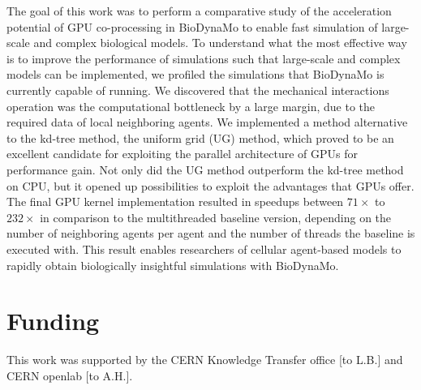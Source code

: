\documentclass[conference]{IEEEtran}
\begin{document}
\par The goal of this work was to perform a comparative study of the acceleration potential of GPU co-processing in BioDynaMo to enable fast simulation of large-scale and complex biological models.
To understand what the most effective way is to improve the performance of simulations such that large-scale and complex models can be implemented, we profiled the simulations that BioDynaMo is currently capable of running.
We discovered that the mechanical interactions operation was the computational bottleneck by a large margin, due to the required data of local neighboring agents.
We implemented a method alternative to the kd-tree method, the uniform grid (UG) method, which proved to be an excellent candidate for exploiting the parallel architecture of GPUs for performance gain.
Not only did the UG method outperform the kd-tree method on CPU, but it opened up possibilities to exploit the advantages that GPUs offer.
The final GPU kernel implementation resulted in speedups between $71\times$ to $232\times$ in comparison to the multithreaded baseline version, depending on the number of neighboring agents per agent and the number of threads the baseline is executed with.
This result enables researchers of cellular agent-based models to rapidly obtain biologically insightful simulations with BioDynaMo.

\section*{Funding}
This  work  was  supported  by  the  CERN Knowledge  Transfer  office  [to L.B.] and CERN openlab [to A.H.].

\printbibliography
\end{document}
